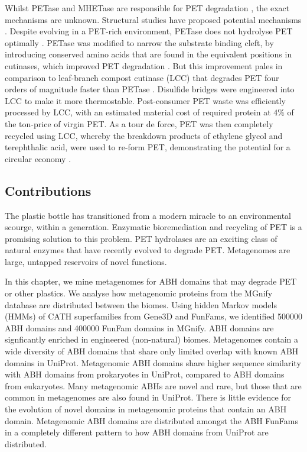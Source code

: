 Whilst PETase and MHETase are responsible for PET degradation \cite{Yoshida2016}, the exact mechanisms are unknown. Structural studies have proposed potential mechanisms \cite{Han2017,Joo2018,Austin2018,Palm2019}. Despite evolving in a PET-rich environment, PETase does not hydrolyse PET optimally \cite{Austin2018}. PETase was modified to narrow the substrate binding cleft, by introducing conserved amino acids that are found in the equivalent positions in cutinases, which improved PET degradation \cite{Austin2018}. But this improvement pales in comparison to leaf-branch compost cutinase (LCC) that degrades PET four orders of magnitude faster than PETase \cite{Tournier2020}. Disulfide bridges were engineered into LCC to make it more thermostable. Post-consumer PET waste was efficiently processed by LCC, with an estimated material cost of required protein at $4\%$ of the ton-price of virgin PET. As a tour de force, PET was then completely recycled using LCC, whereby the breakdown products of ethylene glycol and terephthalic acid, were used to re-form PET, demonstrating the potential for a circular economy \cite{Tournier2020}.

\subsection{Contributions}

The plastic bottle has transitioned from a modern miracle to an environmental scourge, within a generation. Enzymatic bioremediation and recycling of PET is a promising solution to this problem. PET hydrolases are an exciting class of natural enzymes that have recently evolved to degrade PET. Metagenomes are large, untapped reservoirs of novel functions.

In this chapter, we mine metagenomes for ABH domains that may degrade PET or other plastics. We analyse how metagenomic proteins from the MGnify database are distributed between the biomes. Using hidden Markov models (HMMs) of CATH superfamilies from Gene$3$D and FunFams, we identified \num{500000} ABH domains and \num{400000} FunFam domains in MGnify. ABH domains are signficantly enriched in engineered (non-natural) biomes. Metagenomes contain a wide diversity of ABH domains that share only limited overlap with known ABH domains in UniProt. Metagenomic ABH domains share higher sequence similarity with ABH domains from prokaryotes in UniProt, compared to ABH domains from eukaryotes. Many metagenomic ABHs are novel and rare, but those that are common in metagenomes are also found in UniProt. There is little evidence for the evolution of novel domains in metagenomic proteins that contain an ABH domain. Metagenomic ABH domains are distributed amongst the ABH FunFams in a completely different pattern to how ABH domains from UniProt are distributed.

